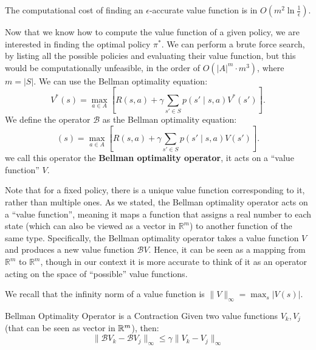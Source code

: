 \documentclass[10pt, a4paper]{report}
\begin{document}
\noindent The computational cost of finding an $\epsilon$-accurate value function is in $O(m^2\ln\frac{1}{\epsilon})$.\bigskip

Now that we know how to compute the value function of a given policy, we are interested in finding the optimal policy $\pi^*$. We can perform a brute force search, by listing all the possible policies and evaluating their value function, but this would be computationally unfeasible, in the order of $O(|A|^m\cdot m^3)$, where $m=|S|$.
We can use the Bellman optimality equation:\begin{equation}
    V^*(s) = \max_{a \in {A}} \left[ R(s,a) + \gamma \sum_{s' \in {S}} p(s' \mid s, a) V^*(s') \right].
\end{equation}
We define the operator $\mathcal B$ as the Bellman optimality equation:\begin{equation}
    [\mathcal BV](s)=\max_{a \in {A}} \left[ R(s,a) + \gamma \sum_{s' \in {S}} p(s' \mid s, a) V(s') \right].
\end{equation}
we call this operator the \textbf{Bellman optimality operator}, it acts on a ``value function'' $V$.
\begin{boxobservation}{}{}
   Note that for a fixed policy, there is a unique value function corresponding to it, rather than multiple ones. As we stated, the Bellman optimality operator acts on a ``value function'', meaning it maps a function that assigns a real number to each state (which can also be viewed as a vector in $\mathbb{R}^m$) to another function of the same type. Specifically, the Bellman optimality operator takes a value function $V$ and produces a new value function $\mathcal{B}V$. Hence, it can be seen as a mapping from $\mathbb{R}^m$ to $\mathbb{R}^m$, though in our context it is more accurate to think of it as an operator acting on the space of ``possible'' value functions.
\end{boxobservation}
\noindent We recall that the infinity norm of a value function is $\|V\|_{\infty}=\max_s|V(s)|$.
\begin{boxtheorem}{Bellman Optimality Operator is a Contraction}{}
    Given two value functions $V_k,V_j$ (that can be seen as vector in ${\mathbb R}^m$), then:\begin{equation}
        \|\mathcal BV_k-\mathcal BV_j\|_\infty\le\gamma\|V_k-V_j\|_\infty
    \end{equation}
\end{boxtheorem}
\end{document}
